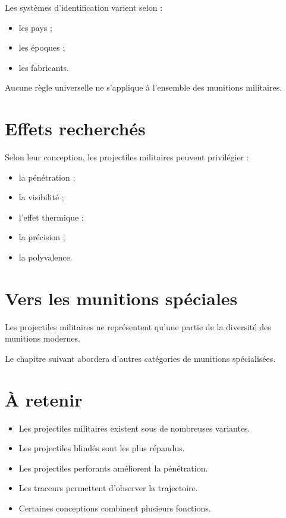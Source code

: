 Les systèmes d'identification varient selon :

\begin{itemize}
    \item les pays ;
    \item les époques ;
    \item les fabricants.
\end{itemize}

Aucune règle universelle ne s'applique à l'ensemble des munitions militaires.

\section{Effets recherchés}

Selon leur conception, les projectiles militaires peuvent privilégier :

\begin{itemize}
    \item la pénétration ;
    \item la visibilité ;
    \item l'effet thermique ;
    \item la précision ;
    \item la polyvalence.
\end{itemize}

\section{Vers les munitions spéciales}

Les projectiles militaires ne représentent qu'une partie de la diversité des
munitions modernes.

Le chapitre suivant abordera d'autres catégories de munitions spécialisées.

\section{À retenir}

\begin{aretenir}

\begin{itemize}
    \item Les projectiles militaires existent sous de nombreuses variantes.
    \item Les projectiles blindés sont les plus répandus.
    \item Les projectiles perforants améliorent la pénétration.
    \item Les traceurs permettent d'observer la trajectoire.
    \item Certaines conceptions combinent plusieurs fonctions.
\end{itemize}

\end{aretenir}
